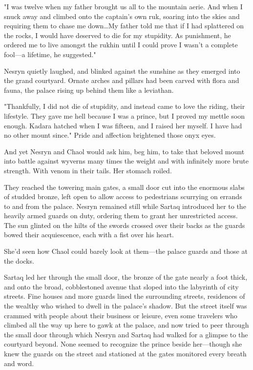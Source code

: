 "I was twelve when my father brought us all to the mountain aerie.
And when I snuck away and climbed onto the captain's own ruk, soaring into the skies and requiring them to chase me down\ldots My father told me that if I had splattered on the rocks, I would have deserved to die for my stupidity.
As punishment, he ordered me to live amongst the rukhin until I could prove I wasn't a complete fool---a lifetime, he suggested."

Nesryn quietly laughed, and blinked against the sunshine as they emerged into the grand courtyard.
Ornate arches and pillars had been carved with flora and fauna, the palace rising up behind them like a leviathan.

"Thankfully, I did not die of stupidity, and instead came to love the riding, their lifestyle.
They gave me hell because I was a prince, but I proved my mettle soon enough.
Kadara hatched when I was fifteen, and I raised her myself.
I have had no other mount since."
Pride and affection brightened those onyx eyes.

And yet Nesryn and Chaol would ask him, beg him, to take that beloved mount into battle against wyverns many times the weight and with infinitely more brute strength.
With venom in their tails.
Her stomach roiled.

They reached the towering main gates, a small door cut into the enormous slabs of studded bronze, left open to allow access to pedestrians scurrying on errands to and from the palace.
Nesryn remained still while Sartaq introduced her to the heavily armed guards on duty, ordering them to grant her unrestricted access.
The sun glinted on the hilts of the swords crossed over their backs as the guards bowed their acquiescence, each with a fist over his heart.

She'd seen how Chaol could barely look at them---the palace guards and those at the docks.

Sartaq led her through the small door, the bronze of the gate nearly a foot thick, and onto the broad, cobblestoned avenue that sloped into the labyrinth of city streets.
Fine houses and more guards lined the surrounding streets, residences of the wealthy who wished to dwell in the palace's shadow.
But the street itself was crammed with people about their business or leisure, even some travelers who climbed all the way up here to gawk at the palace, and now tried to peer through the small door through which Nesryn and Sartaq had walked for a glimpse to the courtyard beyond.
None seemed to recognize the prince beside her---though she knew the guards on the street and stationed at the gates monitored every breath and word.

